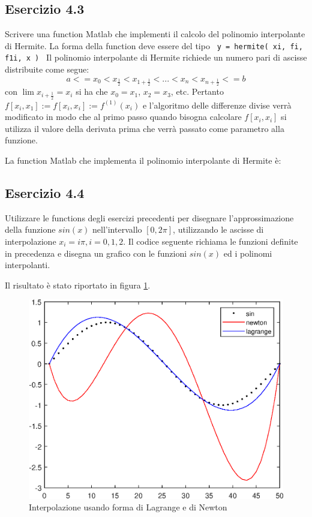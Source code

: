 	\subsection {Esercizio 4.3}
	
Scrivere una function Matlab che implementi il calcolo del polinomio interpolante di Hermite. La forma della function deve essere del tipo \texttt{ y = hermite( xi, fi, f1i, x ) }
\PP
Il polinomio interpolante di Hermite richiede un numero pari di ascisse distribuite come segue: 
\begin{equation}
	a <= x_0 < x_{\frac{1}{2}} < x_{1+\frac{1}{2}} < ... < x_n < x_{n+\frac{1}{2}} <= b
\end{equation}
con $\lim{x_{i+\frac{1}{2}} = x_i}$ si ha che $x_0 = x_1$, $x_2=x_3$, etc. Pertanto $f[x_i, x_1]:=f[x_i, x_i]:=f^{(1)}(x_i)$ e l'algoritmo delle differenze divise verrà modificato in modo che al primo passo quando bisogna calcolare $f[x_i, x_i]$ si utilizza il valore della derivata prima che verrà passato come parametro alla funzione.

La function Matlab che implementa il polinomio interpolante di Hermite è:



	\pagebreak
	\subsection {Esercizio 4.4}
	
Utilizzare le functions degli esercizi precedenti per disegnare l'approssimazione della funzione $sin(x)$  nell'intervallo $[0, 2\pi]$, utilizzando le ascisse di interpolazione $x_{i}=i\pi, i=0,1,2$.
\PP
Il codice seguente richiama le funzioni definite in precedenza e disegna un grafico con le funzioni $sin(x)$ ed i polinomi interpolanti.

Il risultato è stato riportato in figura \ref{sin_interpolation}.

\begin{figure}[h]\label{sin_interpolation}
    \centering
    \includegraphics[scale=0.8]{./capitolo_4/sin_interpolation}
    \caption{Interpolazione usando forma di Lagrange e di Newton}
\end{figure} 



